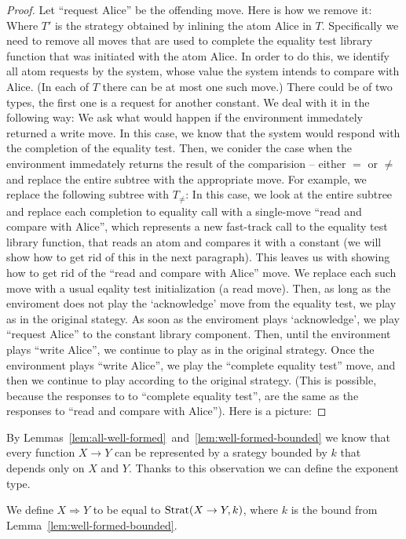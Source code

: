 \begin{proof}
    Let ``request Alice'' be the offending move. Here is how we remove it:
    Where $T'$ is the strategy obtained by inlining the atom Alice in $T$. 
    Specifically we need to remove all moves that are used to complete the 
    equality test library function that was initiated with the atom Alice.
    In order to do this, we identify all atom requests by the system, 
    whose value the system intends to compare with Alice.
    (In each of $T$ there can be at most one such move.)
    There could be of two types, the first one is a request for another 
    constant. We deal with it in the following way:
    We ask what would happen if the environment immedately returned a write move. 
    In this case, we know that the system would respond with the completion of the equality test. 
    Then, we conider the case when the environment immedately returns the result of the comparision -- 
    either $=$ or $\neq$ and replace the entire subtree with the appropriate move. 
    For example, we replace the following subtree with $T_{\neq}$:
    In this case, we look at the entire subtree and replace each completion to equality call 
    with a single-move ``read and compare with Alice'', which represents a new fast-track 
    call to the equality test library function, that reads an atom and compares it with a constant
    (we will show how to get rid of this in the next paragraph).
    This leaves us with showing how to get rid of the ``read and compare with Alice'' move. 
    We replace each such move with a usual eqality test initialization (a read move). 
    Then, as long as the enviroment does not play the `acknowledge' move from the equality test, 
    we play as in the original stategy. As soon as the enviroment plays `acknowledge', 
    we play ``request Alice'' to the constant library component. Then, until the environment 
    plays ``write Alice'', we continue to play as in the original strategy. Once the environment
    plays ``write Alice'', we play the ``complete equality test'' move, and then we continue 
    to play according to the original strategy. (This is possible, because the responses to 
    to ``complete equality test'', are the same as the responses to ``read and compare with Alice''). 
    Here is a picture:
\end{proof}
By Lemmas~\ref{lem:all-well-formed}~and~\ref{lem:well-formed-bounded} we know that every function $X \to Y$ 
can be represented by a srategy bounded by $k$ that depends only on $X$ and $Y$. Thanks to this observation 
we can define the exponent type. 
\begin{definition}
    We define $X \Rightarrow Y$ to be equal to $\text{Strat}(X \to Y, k)$, where $k$ is the bound from Lemma~\ref{lem:well-formed-bounded}.
\end{definition}

